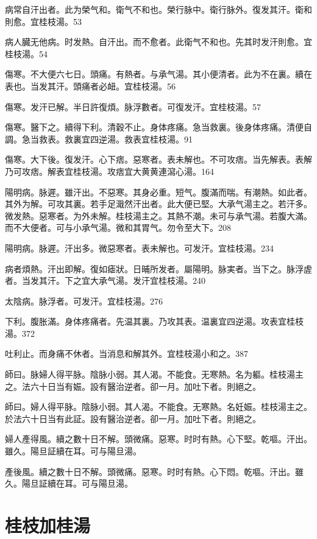 病常自汗出者。此为榮气和。衛气不和也。榮行脉中。衛行脉外。復发其汗。衛和則愈。宜桂枝湯。53

病人臓无他病。时发熱。自汗出。而不愈者。此衛气不和也。先其时发汗則愈。宜桂枝湯。54

傷寒。不大便六七日。頭痛。有熱者。与承气湯。其小便清者。此为不在裏。續在表也。当发其汗。頭痛者必衄。宜桂枝湯。56

傷寒。发汗已解。半日許復煩。脉浮數者。可復发汗。宜桂枝湯。57

傷寒。醫下之。續得下利。清穀不止。身体疼痛。急当救裏。後身体疼痛。清便自調。急当救表。救裏宜四逆湯。救表宜桂枝湯。91

傷寒。大下後。復发汗。心下痞。惡寒者。表未解也。不可攻痞。当先解表。表解乃可攻痞。解表宜桂枝湯。攻痞宜大黄黄連瀉心湯。164

陽明病。脉遲。雖汗出。不惡寒。其身必重。短气。腹滿而喘。有潮熱。如此者。其外为解。可攻其裏。若手足濈然汗出者。此大便已堅。{\khaaitp 大}承气湯主之。若汗多。微发熱。惡寒者。为外未解。{\khaaitp 桂枝湯主之。}其熱不潮。未可与承气湯。若腹大滿。而不大便者。可与小承气湯。微和其胃气。勿令至大下。208

陽明病。脉遲。汗出多。微惡寒者。表未解也。可发汗。宜桂枝湯。234

病者煩熱。汗出即解。復如瘧狀。日晡所发者。屬陽明。脉実者。当下之。脉浮虗者。当发其汗。下之宜{\khaaitp 大}承气湯。发汗宜桂枝湯。240

太陰病。脉浮者。可发汗。宜桂枝湯。276

下利。腹{\khaaitp 胀}滿。身体疼痛者。先温其裏。乃攻其表。温裏宜四逆湯。攻表宜桂枝湯。372

吐利止。而身痛不休者。当消息和解其外。宜桂枝湯小和之。387

師曰。脉婦人得平脉。陰脉小弱。其人渴。不能食。无寒熱。名为軀。桂枝湯主之。法六十日当有娠。設有醫治逆者。卻一月。加吐下者。則絕之。{\wuben}

師曰。婦人得平脉。陰脉小弱。其人渴。不能食。无寒熱。名妊娠。桂枝湯主之。於法六十日当有此証。設有醫治逆者。卻一月。加吐下者。則絕之。{\dengben}

婦人產得風。續之數十日不解。頭微痛。惡寒。时时有熱。心下堅。乾嘔。汗出。雖久。陽旦証續在耳。可与陽旦湯。{\wuben}

產後風。續之數十日不解。頭微痛。惡寒。时时有熱。心下悶。乾嘔。汗出。雖久。陽旦証續在耳。可与陽旦湯。{\dengben}

\section{桂枝加桂湯}

